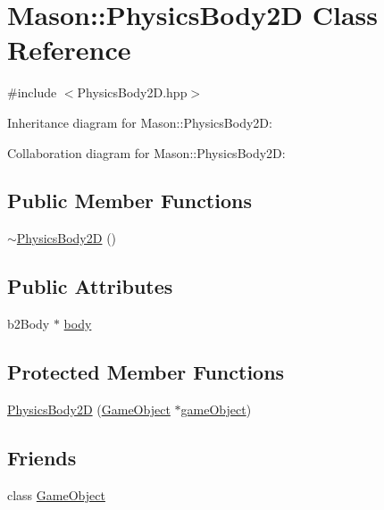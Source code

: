 \hypertarget{class_mason_1_1_physics_body2_d}{}\section{Mason\+:\+:Physics\+Body2D Class Reference}
\label{class_mason_1_1_physics_body2_d}


{\ttfamily \#include $<$Physics\+Body2\+D.\+hpp$>$}



Inheritance diagram for Mason\+:\+:Physics\+Body2D\+:


Collaboration diagram for Mason\+:\+:Physics\+Body2D\+:
\subsection*{Public Member Functions}
\begin{DoxyCompactItemize}
\item 
\hyperlink{class_mason_1_1_physics_body2_d_a9cd23100f41c0ae3dbce853e88f804e1}{$\sim$\+Physics\+Body2D} ()
\end{DoxyCompactItemize}
\subsection*{Public Attributes}
\begin{DoxyCompactItemize}
\item 
b2\+Body $\ast$ \hyperlink{class_mason_1_1_physics_body2_d_abd02e269a86d5b760966a33eefa918d9}{body}
\end{DoxyCompactItemize}
\subsection*{Protected Member Functions}
\begin{DoxyCompactItemize}
\item 
\hyperlink{class_mason_1_1_physics_body2_d_a4b6b50a1b3945ab0669bcdc0748b3d1c}{Physics\+Body2D} (\hyperlink{class_mason_1_1_game_object}{Game\+Object} $\ast$\hyperlink{class_mason_1_1_component_a30030370c35f5562cbbbb0927b0448c8}{game\+Object})
\end{DoxyCompactItemize}
\subsection*{Friends}
\begin{DoxyCompactItemize}
\item 
class \hyperlink{class_mason_1_1_physics_body2_d_a00df87c957d8f7ee0fc51f07a0542f4a}{Game\+Object}
\end{DoxyCompactItemize}

